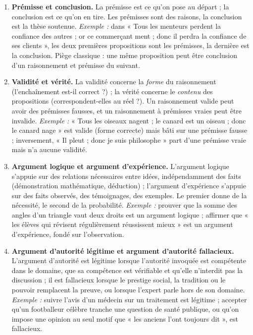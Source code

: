 \documentclass[11pt]{article}
\newcommand{\cle}[1]{{\popxbold\color{popdark}#1}}
\begin{document}
\begin{corrige}
\begin{enumerate}
\item \textbf{\cle{Prémisse} et \cle{conclusion}.} La prémisse est ce qu'on pose au départ ; la conclusion est ce qu'on en tire. Les prémisses sont des raisons, la conclusion est la thèse soutenue. \emph{Exemple :} dans « Tous les menteurs perdent la confiance des autres ; or ce commerçant ment ; donc il perdra la confiance de ses clients », les deux premières propositions sont les prémisses, la dernière est la conclusion. Piège classique : une même proposition peut être conclusion d'un raisonnement et prémisse du suivant.
\item \textbf{\cle{Validité} et \cle{vérité}.} La validité concerne la \emph{forme} du raisonnement (l'enchaînement est-il correct ?) ; la vérité concerne le \emph{contenu} des propositions (correspondent-elles au réel ?). Un raisonnement valide peut avoir des prémisses fausses, et un raisonnement à prémisses vraies peut être invalide. \emph{Exemple :} « Tous les oiseaux nagent ; le canard est un oiseau ; donc le canard nage » est valide (forme correcte) mais bâti sur une prémisse fausse ; inversement, « Il pleut ; donc je suis philosophe » part d'une prémisse vraie mais n'a aucune validité.
\item \textbf{\cle{Argument logique} et \cle{argument d'expérience}.} L'argument logique s'appuie sur des relations nécessaires entre idées, indépendamment des faits (démonstration mathématique, déduction) ; l'argument d'expérience s'appuie sur des faits observés, des témoignages, des exemples. Le premier donne de la nécessité, le second de la probabilité. \emph{Exemple :} prouver que la somme des angles d'un triangle vaut deux droits est un argument logique ; affirmer que « les élèves qui révisent régulièrement réussissent mieux » est un argument d'expérience, fondé sur l'observation.
\item \textbf{Argument d'autorité \cle{légitime} et argument d'autorité \cle{fallacieux}.} L'argument d'autorité est légitime lorsque l'autorité invoquée est compétente dans le domaine, que sa compétence est vérifiable et qu'elle n'interdit pas la discussion ; il est fallacieux lorsque le prestige social, la tradition ou le pouvoir remplacent la preuve, ou lorsque l'expert parle hors de son domaine. \emph{Exemple :} suivre l'avis d'un médecin sur un traitement est légitime ; accepter qu'un footballeur célèbre tranche une question de santé publique, ou qu'on impose une opinion au seul motif que « les anciens l'ont toujours dit », est fallacieux.

\end{enumerate}
\end{corrige}
\end{document}
